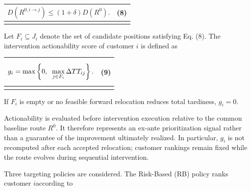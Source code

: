 \documentclass[
]{article}
\newcounter{none} %
\begin{document}
{\def\LTcaptype{none} %
\begin{longtable}[]{@{}
  >{\raggedright\arraybackslash}p{}
  >{\raggedright\arraybackslash}p{}@{}}
\toprule\noalign{}
\begin{minipage}[b]{\linewidth}\raggedright
\[D\left( R^{0,i \rightarrow j} \right) \leq (1 + \delta)D\left( R^{0} \right).\]
\end{minipage} & \begin{minipage}[b]{\linewidth}\raggedleft
(8)
\end{minipage} \\
\midrule\noalign{}
\endhead
\bottomrule\noalign{}
\endlastfoot
\end{longtable}
}

Let \(F_{i} \subseteq J_{i}\) denote the set of candidate positions
satisfying Eq. (8). The intervention actionability score of customer
\(i\) is defined as

{\def\LTcaptype{none} %
\begin{longtable}[]{@{}
  >{\raggedright\arraybackslash}p{}
  >{\raggedright\arraybackslash}p{}@{}}
\toprule\noalign{}
\begin{minipage}[b]{\linewidth}\raggedright
\[g_{i} = \max\left\{ 0,\text{\:\,}\max_{j \in F_{i}}\Delta TT_{ij} \right\}.\]
\end{minipage} & \begin{minipage}[b]{\linewidth}\raggedleft
(9)
\end{minipage} \\
\midrule\noalign{}
\endhead
\bottomrule\noalign{}
\endlastfoot
\end{longtable}
}

If \(F_{i}\) is empty or no feasible forward relocation reduces total
tardiness, \(g_{i} = 0\).

Actionability is evaluated before intervention execution relative to the
common baseline route \(R^{0}\). It therefore represents an ex-ante
prioritization signal rather than a guarantee of the improvement
ultimately realized. In particular, \(g_{i}\) is not recomputed after
each accepted relocation; customer rankings remain fixed while the route
evolves during sequential intervention.

Three targeting policies are considered. The Risk-Based (RB) policy
ranks customer \(i\)according to
\end{document}
